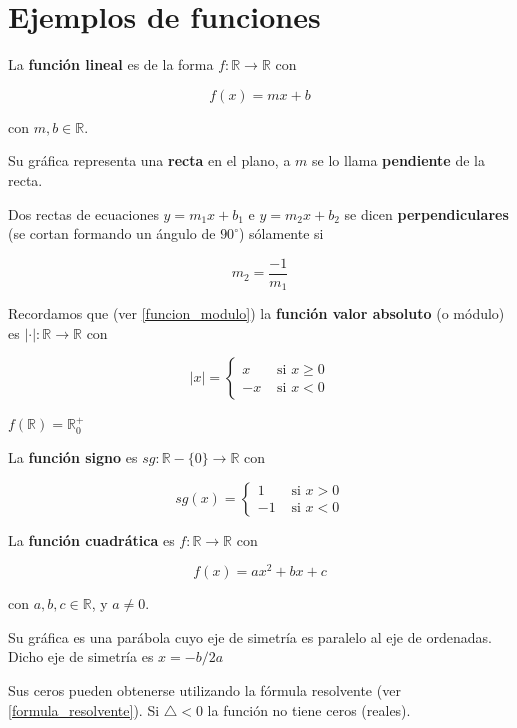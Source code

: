 \section{Ejemplos de funciones}

\begin{definition} 

La \textbf{función lineal} es de la forma $f : \mathbb{R} \to \mathbb{R}$ con 

$$ f(x) = mx + b $$

con $m,b \in \mathbb{R}$.

Su gráfica representa una \textbf{recta} en el plano, a $m$ se lo llama \textbf{pendiente} de la recta.

Dos rectas de ecuaciones $y = m_1 x + b_1$ e $y = m_2 x + b_2$ se dicen \textbf{perpendiculares} (se cortan formando un ángulo de $90^{\circ}$) sólamente si 

$$\boxed{m_2 = \frac{-1}{m_1}}$$

\end{definition}

\begin{definition} 

Recordamos que (ver \ref{funcion_modulo}) la \textbf{función valor absoluto} (o módulo) es $|\cdot| : \mathbb{R} \to \mathbb{R}$ con

$$|x| = \begin{cases} x & \textrm{ si } x \geq 0 \\ -x & \textrm{ si } x < 0 \end{cases}$$

$f(\mathbb{R}) = \mathbb{R}_0^+$
\end{definition}

\begin{definition} 
La \textbf{función signo} es $sg : \mathbb{R} - \{0\} \to \mathbb{R}$ con

$$sg(x) = \begin{cases} 1 & \textrm{ si } x > 0 \\ -1 & \textrm{ si } x < 0 \end{cases}$$
\end{definition}

\begin{definition} 
La \textbf{función cuadrática} es $f : \mathbb{R} \to \mathbb{R}$ con

$$f(x) = ax^2 + bx + c$$

con $a,b,c \in \mathbb{R}$, y $a \neq 0$.

Su gráfica es una parábola cuyo eje de simetría es paralelo al eje de ordenadas.  Dicho eje de simetría es $x = -b/2a$

Sus ceros pueden obtenerse utilizando la fórmula resolvente (ver \ref{formula_resolvente}).  Si $\triangle < 0$ la función no tiene ceros (reales).
\end{definition}

